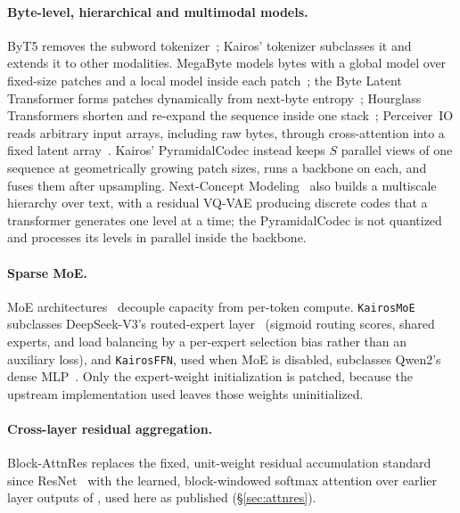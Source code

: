 \documentclass[11pt]{article}
\begin{document}
\paragraph{Byte-level, hierarchical and multimodal models.} ByT5 removes the
subword tokenizer~\citep{xue2022byt5}; Kairos' tokenizer subclasses it and
extends it to other modalities. MegaByte models bytes with a global model over
fixed-size patches and a local model inside each
patch~\citep{yu2023megabyte}; the Byte Latent Transformer forms patches
dynamically from next-byte entropy~\citep{pagnoni2024blt}; Hourglass
Transformers shorten and re-expand the sequence inside one
stack~\citep{nawrot2022hourglass}; Perceiver~IO reads arbitrary input arrays,
including raw bytes, through cross-attention into a fixed latent
array~\citep{jaegle2022perceiverio}. Kairos' PyramidalCodec instead keeps
$S$ parallel views of one sequence at geometrically growing patch sizes,
runs a backbone on each, and fuses them after upsampling. Next-Concept
Modeling~\citep{kumbong2026ncm} also builds a multiscale hierarchy over text, with a residual
VQ-VAE producing discrete codes that a transformer generates one level at a time; the PyramidalCodec
is not quantized and processes its levels in parallel inside the backbone.

\paragraph{Sparse MoE.} MoE
architectures~\citep{shazeer2017outrageously,fedus2021switch,dai2024deepseekmoe,deepseekv3}
decouple capacity from per-token compute. \texttt{KairosMoE} subclasses
DeepSeek-V3's routed-expert layer~\citep{deepseekv3} (sigmoid routing scores,
shared experts, and load balancing by a per-expert selection bias rather than
an auxiliary loss), and \texttt{KairosFFN}, used when MoE is disabled,
subclasses Qwen2's dense MLP~\citep{qwen2techreport}. Only the expert-weight
initialization is patched, because the upstream implementation used leaves
those weights uninitialized.

\paragraph{Cross-layer residual aggregation.} Block-AttnRes replaces the
fixed, unit-weight residual accumulation standard since
ResNet~\citep{he2015resnet} with the learned, block-windowed softmax
attention over earlier layer outputs of \citet{kimiteam2026attnres}, used
here as published (\S\ref{sec:attnres}).
\end{document}
